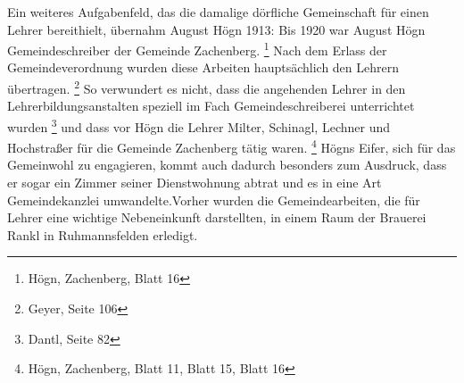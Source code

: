Ein weiteres Aufgabenfeld, das die damalige dörfliche Gemeinschaft für
einen Lehrer bereithielt, übernahm August Högn 1913: Bis 1920 war
August Högn Gemeindeschreiber der Gemeinde Zachenberg. \footnote{Högn,
Zachenberg, Blatt 16} Nach dem Erlass der Gemeindeverordnung wurden
diese Arbeiten hauptsächlich den Lehrern übertragen. \footnote{Geyer,
Seite 106} So verwundert es nicht, dass die angehenden Lehrer in den
Lehrerbildungsanstalten speziell im Fach Gemeindeschreiberei
unterrichtet wurden \footnote{Dantl, Seite 82} und dass vor Högn die
Lehrer Milter, Schinagl, Lechner und Hochstraßer für die Gemeinde
Zachenberg tätig waren. \footnote{Högn, Zachenberg, Blatt 11, Blatt 15,
Blatt 16} Högns Eifer, sich für das Gemeinwohl zu engagieren, kommt
auch dadurch besonders zum Ausdruck, dass er sogar ein Zimmer seiner
Dienstwohnung abtrat und es in eine Art Gemeindekanzlei
umwandelte.Vorher wurden die
Gemeindearbeiten, die für Lehrer eine wichtige Nebeneinkunft
darstellten, in einem Raum der Brauerei Rankl in Ruhmannsfelden
erledigt.
